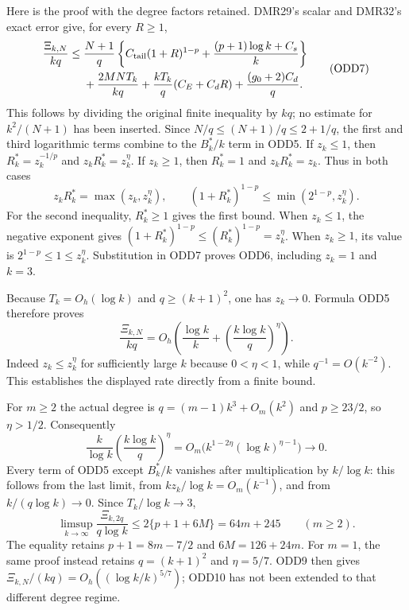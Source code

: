 Here is the proof with the degree factors retained. DMR29's
scalar and DMR32's exact error give, for every $R\geq1$,
\[
\begin{split}
 \frac{\Xi_{k,N}}{kq}\leq{}&
 \frac{N+1}{q}\left\{C_{\rm tail}(1+R)^{1-p}
                +\frac{(p+1)\log k+C_s}{k}\right\}\\
 &+\frac{2MN T_k}{kq}
       +\frac{kT_k}{q}(C_E+C_dR)+\frac{(g_0+2)C_d}{q}.
\end{split}\tag{ODD7}
\]
This follows by dividing the original finite inequality by $kq$;
no estimate for $k^2/(N+1)$ has been inserted. Since
$N/q\leq(N+1)/q\leq2+1/q$, the first and third logarithmic
terms combine to the $B_k^*/k$ term in ODD5. If $z_k\leq1$,
then $R_k^*=z_k^{-1/p}$ and
$z_kR_k^*=z_k^\eta$. If $z_k\geq1$, then $R_k^*=1$ and
$z_kR_k^*=z_k$. Thus in both cases
\[
 z_kR_k^*=\max(z_k,z_k^\eta),\qquad
 (1+R_k^*)^{1-p}\leq\min(2^{1-p},z_k^\eta).
 \tag{ODD8}
\]
For the second inequality, $R_k^*\geq1$ gives the first
bound. When $z_k\leq1$, the negative exponent gives
$(1+R_k^*)^{1-p}\leq(R_k^*)^{1-p}=z_k^\eta$.
When $z_k\geq1$, its value is $2^{1-p}\leq1\leq z_k^\eta$.
Substitution in ODD7 proves ODD6, including $z_k=1$ and $k=3$.

Because $T_k=O_h(\log k)$ and $q\geq(k+1)^2$, one has
$z_k\to0$. Formula ODD5 therefore proves
\[
 \frac{\Xi_{k,N}}{kq}
 =O_h\left(\frac{\log k}{k}
                   +\left(\frac{k\log k}{q}\right)^\eta\right).
 \tag{ODD9}
\]
Indeed $z_k\leq z_k^\eta$ for sufficiently large $k$ because
$0<\eta<1$, while $q^{-1}=O(k^{-2})$. This establishes
the displayed rate directly from a finite bound.

For $m\geq2$ the actual degree is
$q=(m-1)k^3+O_m(k^2)$ and $p\geq23/2$, so $\eta>1/2$.
Consequently
\[
 \frac{k}{\log k}\left(\frac{k\log k}{q}\right)^\eta
 =O_m\bigl(k^{1-2\eta}(\log k)^{\eta-1}\bigr)\longrightarrow0.
\]
Every term of ODD5 except $B_k^*/k$ vanishes after multiplication
by $k/\log k$: this follows from the last limit, from
$kz_k/\log k=O_m(k^{-1})$, and from
$k/(q\log k)\to0$. Since $T_k/\log k\to3$,
\[
 \boxed{\quad
 \limsup_{k\to\infty}\frac{\Xi_{k,2q}}{q\log k}
 \leq2\{p+1+6M\}=64m+245\qquad(m\geq2).
 \quad}\tag{ODD10}
\]
The equality retains $p+1=8m-7/2$ and $6M=126+24m$.
For $m=1$, the same proof instead retains
$q=(k+1)^2$ and $\eta=5/7$. ODD9 then gives
$\Xi_{k,N}/(kq)=O_h((\log k/k)^{5/7})$; ODD10 has
not been extended to that different degree regime.

